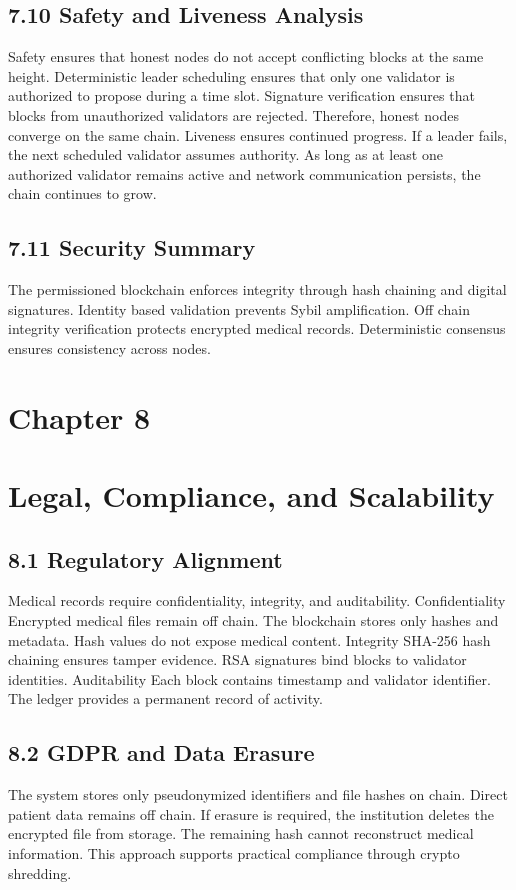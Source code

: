 \subsection*{7.10 Safety and Liveness Analysis}
Safety ensures that honest nodes do not accept conflicting blocks at the same height.
Deterministic leader scheduling ensures that only one validator is authorized to propose during a time slot. Signature verification ensures that blocks from unauthorized validators are rejected. Therefore, honest nodes converge on the same chain.
Liveness ensures continued progress.
If a leader fails, the next scheduled validator assumes authority. As long as at least one authorized validator remains active and network communication persists, the chain continues to grow.

\subsection*{7.11 Security Summary}
The permissioned blockchain enforces integrity through hash chaining and digital signatures. Identity based validation prevents Sybil amplification. Off chain integrity verification protects encrypted medical records. Deterministic consensus ensures consistency across nodes.

\newpage
\section*{Chapter 8}
\label{ch:8}
\section*{Legal, Compliance, and Scalability}

\subsection*{8.1 Regulatory Alignment}
Medical records require confidentiality, integrity, and auditability.
Confidentiality
Encrypted medical files remain off chain. The blockchain stores only hashes and metadata. Hash values do not expose medical content.
Integrity
SHA-256 hash chaining ensures tamper evidence. RSA signatures bind blocks to validator identities.
Auditability
Each block contains timestamp and validator identifier. The ledger provides a permanent record of activity.

\subsection*{8.2 GDPR and Data Erasure}
The system stores only pseudonymized identifiers and file hashes on chain. Direct patient data remains off chain.
If erasure is required, the institution deletes the encrypted file from storage. The remaining hash cannot reconstruct medical information. This approach supports practical compliance through crypto shredding.

